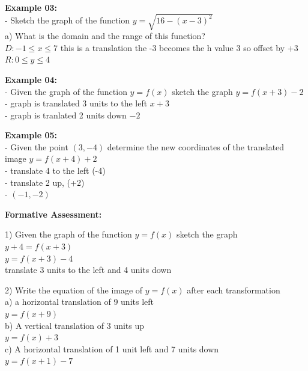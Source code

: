 \documentclass[10pt]{article}
\begin{document}
\textbf{Example 03:} \\
- Sketch the graph of the function \(y = \sqrt{16 - (x-3)^2} \) \\
a) What is the domain and the range of this function? \\
\(D: -1 \leq  x \leq 7 \) this is a translation the -3 becomes the h value 3 so offset by +3\\
\(R: 0 \leq y \leq 4 \)


\textbf{Example 04:} \\
- Given the graph of the function \(y = f(x)\) sketch the graph \(y = f(x+3) -2\)  \\
- graph is translated 3 units to the left \(x+3\) \\
- graph is tranlated 2 units down \(-2\)


\textbf{Example 05:} \\
- Given the point \((3, -4)\) determine the new coordinates of the translated image \(y = f(x+4) +2\)  \\
- translate 4 to the left (-4) \\
- translate 2 up, (+2) \\
- \((-1, -2)\)
\clearpage


\textbf{Formative Assessment:}


1) Given the graph of the function \(y = f(x)\) sketch the graph \(y + 4 = f(x+3)\)  \\
\hspace*{1em} \(y = f(x+3) - 4\) \\
\hspace*{1em} translate 3 units to the left and 4 units down


2) Write the equation of the image of  \(y = f(x)\) after each transformation  \\
\hspace*{1em} a) a horizontal translation of 9 units left \\
\hspace*{2em} \(y = f(x + 9)\)\\
\hspace*{1em} b) A vertical translation of 3 units up \\
\hspace*{2em} \(y = f(x) + 3\)\\
\hspace*{1em} c) A horizontal translation of 1 unit left and 7 units down \\
\hspace*{2em} \(y = f(x + 1) - 7\)
\end{document}

